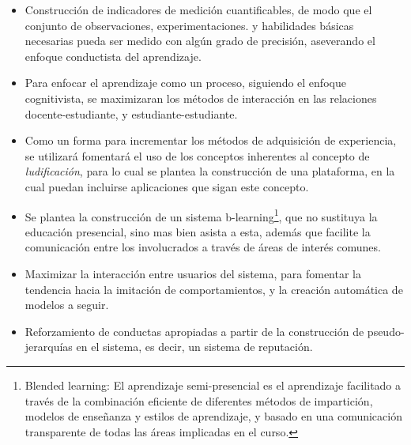 \begin{itemize}
\item Construcción de indicadores de medición cuantificables, de
modo que el conjunto de observaciones, experimentaciones. y habilidades básicas 
necesarias pueda ser medido con algún grado de precisión, aseverando el enfoque
conductista del aprendizaje.
\item Para enfocar el aprendizaje como un proceso, siguiendo el enfoque
cognitivista, se maximizaran los métodos de interacción en las relaciones
docente-estudiante, y estudiante-estudiante.
\item Como un forma para incrementar los métodos de adquisición de experiencia,
se utilizará fomentará el uso de los conceptos inherentes al concepto de 
\emph{ludificación}, para lo cual se plantea la construcción de una plataforma,
en la cual puedan incluirse aplicaciones que sigan este concepto.
\item Se plantea la construcción de un sistema b-learning\footnote{Blended
learning: El aprendizaje semi-presencial es el aprendizaje facilitado a través
de la combinación eficiente de diferentes métodos de impartición, modelos de
enseñanza y estilos de aprendizaje, y basado en una comunicación transparente
de todas las áreas implicadas en el curso.}, que no sustituya la educación
presencial, sino mas bien asista a esta, además que facilite la comunicación
entre los involucrados a través de áreas de interés comunes.
\item Maximizar la interacción entre usuarios del sistema, para fomentar la
tendencia hacia la imitación de comportamientos, y la creación automática de
modelos a seguir.
\item Reforzamiento de conductas apropiadas a partir de la construcción de pseudo-jerarquías en el sistema, es decir, un sistema de reputación.
\end{itemize}
